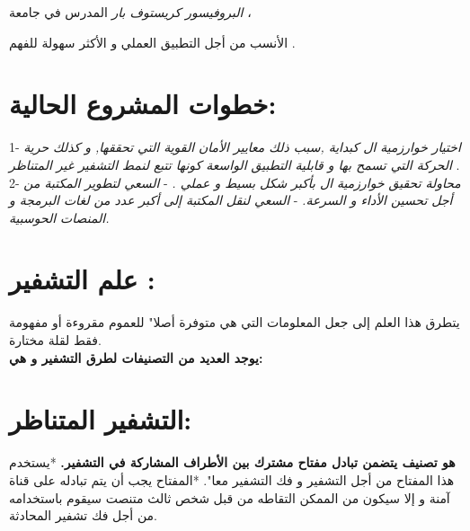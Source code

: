 \documentclass[11pt,a4paper]{report}
\begin{document}
\begin{otherlanguage}{arabic}
\begin{otherlanguage}{arabic}
\begin{center}
\textit{البروفيسور كريستوف بار} 
المدرس في جامعة \textit{} ،

الأنسب من أجل التطبيق العملي و الأكثر سهولة للفهم .
\end{center}
\end{otherlanguage}
 
\chapter{خطوات المشروع الحالية:}
\begin{otherlanguage}{arabic}
\begin{center}
1- \textit{اختيار خوارزمية ال  كبداية ,سبب ذلك معايير الأمان القوية التي تحققها, و كذلك حرية الحركة التي تسمح بها و قابلية التطبيق الواسعة كونها تتبع لنمط التشفير غير المتناظر} .
\\
2- \textit{\textit{محاولة تحقيق  خوارزمية ال\textbf{ } بأكبر شكل بسيط و عملي .}}
- \textit{ السعي لتطوير المكتبة من أجل تحسين الأداء و السرعة.}
- \textit{ السعي لنقل المكتبة إلى أكبر عدد من لغات البرمجة و المنصات الحوسبية.}

\end{center}
\end{otherlanguage}
\chapter{علم التشفير :}
\begin{otherlanguage}{arabic}
\begin{center}

يتطرق هذا العلم إلى جعل المعلومات التي هي متوفرة أصلا" للعموم مقروءة أو مفهومة فقط لقلة مختارة.
\\
\textbf{يوجد العديد من التصنيفات لطرق التشفير و هي:}



\end{center}
\end{otherlanguage}
\chapter{التشفير المتناظر:}
\begin{center}
\textbf{هو تصنيف يتضمن تبادل مفتاح مشترك بين الأطراف المشاركة في التشفير.}
\newline
*يستخدم هذا المفتاح من أجل التشفير و فك التشفير معا".
\newline
*المفتاح يجب أن يتم تبادله على قناة آمنة و إلا سيكون من الممكن التقاطه من قبل شخص ثالث متنصت سيقوم باستخدامه من أجل فك تشفير المحادثة.
\end{center}

\end{otherlanguage}
\end{document}
